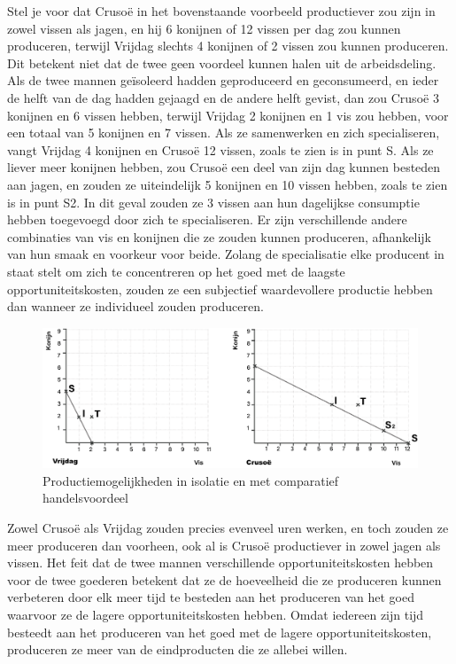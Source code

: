 Stel je voor dat Crusoë in het bovenstaande voorbeeld productiever zou zijn in zowel vissen als jagen, en hij 6 konijnen of 12 vissen per dag zou kunnen produceren, terwijl Vrijdag slechts 4 konijnen of 2 vissen zou kunnen produceren. Dit betekent niet dat de twee geen voordeel kunnen halen uit de arbeidsdeling. Als de twee mannen geïsoleerd hadden geproduceerd en geconsumeerd, en ieder de helft van de dag hadden gejaagd en de andere helft gevist, dan zou Crusoë 3 konijnen en 6 vissen hebben, terwijl Vrijdag 2 konijnen en 1 vis zou hebben, voor een totaal van 5 konijnen en 7 vissen. Als ze samenwerken en zich specialiseren, vangt Vrijdag 4 konijnen en Crusoë 12 vissen, zoals te zien is in punt S. Als ze liever meer konijnen hebben, zou Crusoë een deel van zijn dag kunnen besteden aan jagen, en zouden ze uiteindelijk 5 konijnen en 10 vissen hebben, zoals te zien is in punt S2. In dit geval zouden ze 3 vissen aan hun dagelijkse consumptie hebben toegevoegd door zich te specialiseren. Er zijn verschillende andere combinaties van vis en konijnen die ze zouden kunnen produceren, afhankelijk van hun smaak en voorkeur voor beide. Zolang de specialisatie elke producent in staat stelt om zich te concentreren op het goed met de laagste opportuniteitskosten, zouden ze een subjectief waardevollere productie hebben dan wanneer ze individueel zouden produceren.

\begin{figure}[!htb]
\centering
    \includegraphics[width=\textwidth]{figures/fig18.pdf}
    \caption[Productiemogelijkheden in isolatie en met comparatief handelsvoordeel]{Productiemogelijkheden in isolatie en met comparatief handelsvoordeel}
    \label{fig18}
\end{figure}

Zowel Crusoë als Vrijdag zouden precies evenveel uren werken, en toch zouden ze meer produceren dan voorheen, ook al is Crusoë productiever in zowel jagen als vissen. Het feit dat de twee mannen verschillende opportuniteitskosten hebben voor de twee goederen betekent dat ze de hoeveelheid die ze produceren kunnen verbeteren door elk meer tijd te besteden aan het produceren van het goed waarvoor ze de lagere opportuniteitskosten hebben. Omdat iedereen zijn tijd besteedt aan het produceren van het goed met de lagere opportuniteitskosten, produceren ze meer van de eindproducten die ze allebei willen.

